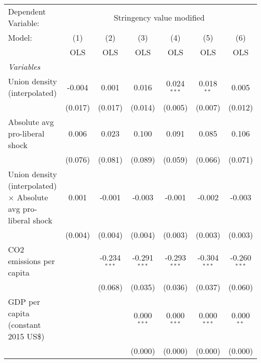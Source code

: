 
\begingroup
\centering
\begin{tabular}{lcccccc}
   \toprule
   Dependent Variable: & \multicolumn{6}{c}{Stringency value modified}\\
   Model:                                                                & (1)     & (2)            & (3)            & (4)            & (5)            & (6)\\  
                                                                         &  OLS    & OLS            & OLS            & OLS            & OLS            & OLS\\  
   \midrule
   \emph{Variables}\\
   Union density (interpolated)                                          & -0.004  & 0.001          & 0.016          & 0.024$^{***}$  & 0.018$^{**}$   & 0.005\\   
                                                                         & (0.017) & (0.017)        & (0.014)        & (0.005)        & (0.007)        & (0.012)\\   
   Absolute avg pro-liberal shock                                        & 0.006   & 0.023          & 0.100          & 0.091          & 0.085          & 0.106\\   
                                                                         & (0.076) & (0.081)        & (0.089)        & (0.059)        & (0.066)        & (0.071)\\   
   Union density (interpolated) $\times$ Absolute avg pro-liberal shock  & 0.001   & -0.001         & -0.003         & -0.001         & -0.002         & -0.003\\   
                                                                         & (0.004) & (0.004)        & (0.004)        & (0.003)        & (0.003)        & (0.003)\\   
   CO2 emissions per capita                                              &         & -0.234$^{***}$ & -0.291$^{***}$ & -0.293$^{***}$ & -0.304$^{***}$ & -0.260$^{***}$\\   
                                                                         &         & (0.068)        & (0.035)        & (0.036)        & (0.037)        & (0.060)\\   
   GDP per capita (constant 2015 US\$)                                   &         &                & 0.000$^{***}$  & 0.000$^{***}$  & 0.000$^{***}$  & 0.000$^{**}$\\   
                                                                         &         &                & (0.000)        & (0.000)        & (0.000)        & (0.000)\\   

\end{tabular}
